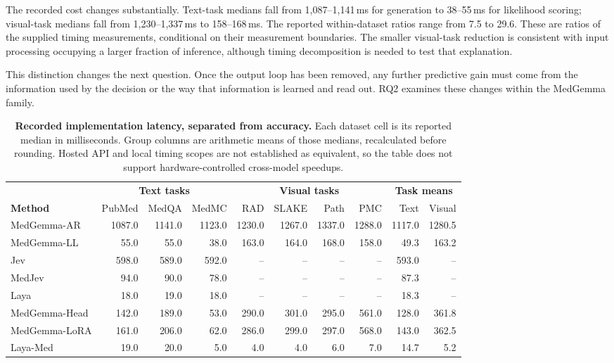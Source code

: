 The recorded cost changes substantially. Text-task medians fall from 1,087--1,141\,ms for generation to 38--55\,ms for likelihood scoring; visual-task medians fall from 1,230--1,337\,ms to 158--168\,ms. The reported within-dataset ratios range from 7.5 to 29.6. These are ratios of the supplied timing measurements, conditional on their measurement boundaries. The smaller visual-task reduction is consistent with input processing occupying a larger fraction of inference, although timing decomposition is needed to test that explanation.


This distinction changes the next question. Once the output loop has been removed, any further predictive gain must come from the information used by the decision or the way that information is learned and read out. RQ2 examines these changes within the MedGemma family.

\begin{table}[t]
\centering\scriptsize\setlength{\tabcolsep}{3.4pt}\renewcommand{\arraystretch}{1.23}
\caption{\textbf{Recorded implementation latency, separated from accuracy.} Each dataset cell is its reported median in milliseconds. Group columns are arithmetic means of those medians, recalculated before rounding. Hosted API and local timing scopes are not established as equivalent, so the table does not support hardware-controlled cross-model speedups.}
\label{tab:latency}
\begin{tabular*}{\linewidth}{@{\extracolsep{\fill}}lrrrrrrrrr@{}}
\toprule
 & \multicolumn{3}{c}{\textbf{Text tasks}} & \multicolumn{4}{c}{\textbf{Visual tasks}} & \multicolumn{2}{c}{\textbf{Task means}}\\
\cmidrule(lr){2-4}\cmidrule(lr){5-8}\cmidrule(lr){9-10}
\textbf{Method} & PubMed & MedQA & MedMC & RAD & SLAKE & Path & PMC & Text & Visual\\
\midrule
MedGemma-AR & 1087.0 & 1141.0 & 1123.0 & 1230.0 & 1267.0 & 1337.0 & 1288.0 & 1117.0 & 1280.5\\
MedGemma-LL & 55.0 & 55.0 & 38.0 & 163.0 & 164.0 & 168.0 & 158.0 & 49.3 & 163.2\\
Jev & 598.0 & 589.0 & 592.0 & -- & -- & -- & -- & 593.0 & --\\
MedJev & 94.0 & 90.0 & 78.0 & -- & -- & -- & -- & 87.3 & --\\
Laya & 18.0 & 19.0 & 18.0 & -- & -- & -- & -- & 18.3 & --\\
\midrule
\textcolor{PaperPurple}{MedGemma-Head} & 142.0 & 189.0 & 53.0 & 290.0 & 301.0 & 295.0 & 561.0 & 128.0 & 361.8\\
\textcolor{PaperPurple}{MedGemma-LoRA} & 161.0 & 206.0 & 62.0 & 286.0 & 299.0 & 297.0 & 568.0 & 143.0 & 362.5\\
\textcolor{PaperTeal}{Laya-Med} & 19.0 & 20.0 & 5.0 & 4.0 & 4.0 & 6.0 & 7.0 & 14.7 & 5.2\\
\bottomrule
\end{tabular*}
\end{table}


